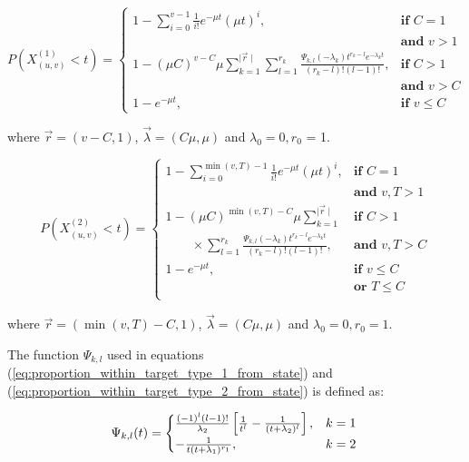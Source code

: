 \begin{equation}\label{eq:proportion_within_target_type_1_from_state}
    P(X_{(u,v)}^{(1)} < t) = 
    \begin{cases}
        1 - \sum_{i=0}^{v-1} \frac{1}{i!} e^{-\mu t} (\mu t)^i, 
            & \textbf{if } C = 1 \\
            & \textbf{and } v>1 \\
        1 - (\mu C)^{v-C} \mu  
            \sum_{k=1}^{\mid \vec{r} \mid} \sum_{l=1}^{r_k}
            \frac{\Psi_{k,l}(-\lambda_k)t^{r_k - l} 
            e^{-\lambda_k t}}{(r_k - l)! (l - 1)!},
            & \textbf{if } C > 1 \\
            & \textbf{and } v > C \\
        1 - e^{-\mu t},  & \textbf{if } v \leq C
    \end{cases}
\end{equation}

\noindent
where \(\vec{r}=(v - C, 1)\), \(\vec{\lambda}=(C \mu, \mu)\) and 
\(\lambda_0 = 0, r_0\) = 1. 

\begin{equation}\label{eq:proportion_within_target_type_2_from_state}
    P(X_{(u,v)}^{(2)} < t) = 
    \begin{cases}
        1 - \sum_{i=0}^{\min(v,T)-1} \frac{1}{i!} e^{-\mu t} (\mu t)^i,  
            & \textbf{if } C = 1 \\ 
            & \textbf{and } v, T > 1 \\
        1 - (\mu C) ^ {\min(v,T) - C} \mu  
        \sum_{k=1}^{\mid \vec{r} \mid} & \textbf{if } C > 1 \\
        \qquad \times \sum_{l=1}^{r_k}
        \frac{\Psi_{k,l}(-\lambda_k)t^{r_k - l} 
        e^{-\lambda_k t}}{(r_k - l)! (l - 1)!}, 
            & \textbf{and } v, T  > C\\
        1 - e^{-\mu t}, & \textbf{if } v \leq C \\ 
            & \textbf{or } T \leq C \\
    \end{cases}
\end{equation}

\noindent
where \(\vec{r}=(\min(v, T) - C, 1)\), \(\vec{\lambda}=(C \mu, \mu)\) and
\(\lambda_0 = 0, r_0 = 1\).


The function \(\Psi_{k,l}\) used in equations 
(\ref{eq:proportion_within_target_type_1_from_state}) and 
(\ref{eq:proportion_within_target_type_2_from_state}) is defined as:

\begin{equation}
    \Psi_{k,l}(t) = 
    \begin{cases} 
        \frac{(-1)^{l} (l-1)!}{\lambda_2} \left[\frac{1}{t^l} - \frac{1}
        {(t + \lambda_2)^l}\right] , & k=1 \\
        - \frac{1}{t (t + \lambda_1)^{r_1}}, & k=2
    \end{cases} \nonumber \\
\end{equation}

